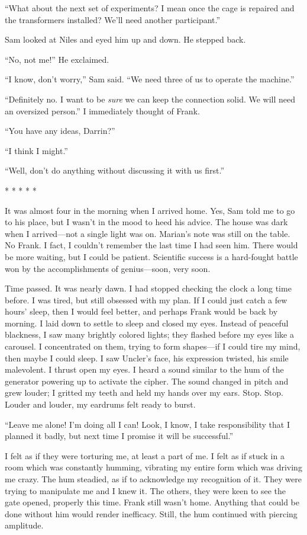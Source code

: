 ``What about the next set of experiments? I mean once the cage is
repaired and the transformers installed? We'll need another
participant.''

Sam looked at Niles and eyed him up and down. He stepped back.

``No, not me!'' He exclaimed.

``I know, don't worry,'' Sam said. ``We need three of us to operate the
machine.''

``Definitely no. I want to be \emph{sure} we can keep the connection
solid. We will need an oversized person.'' I immediately thought of
Frank.

``You have any ideas, Darrin?''

``I think I might.''

``Well, don't do anything without discussing it with us first.''

* * * * *

It was almost four in the morning when I arrived home. Yes, Sam told me
to go to his place, but I wasn't in the mood to heed his advice. The
house was dark when I arrived---not a single light was on. Marian's note
was still on the table. No Frank. I fact, I couldn't remember the last
time I had seen him. There would be more waiting, but I could be
patient. Scientific success is a hard-fought battle won by the
accomplishments of genius---soon, very soon.

Time passed. It was nearly dawn. I had stopped checking the clock a long
time before. I was tired, but still obsessed with my plan. If I could
just catch a few hours' sleep, then I would feel better, and perhaps
Frank would be back by morning. I laid down to settle to sleep and
closed my eyes. Instead of peaceful blackness, I saw many brightly
colored lights; they flashed before my eyes like a carousel. I
concentrated on them, trying to form shapes---if I could tire my mind,
then maybe I could sleep. I saw Uncler's face, his expression twisted,
his smile malevolent. I thrust open my eyes. I heard a sound similar to
the hum of the generator powering up to activate the cipher. The sound
changed in pitch and grew louder; I gritted my teeth and held my hands
over my ears. Stop. Stop. Louder and louder, my eardrums felt ready to
burst.

``Leave me alone! I'm doing all I can! Look, I know, I take
responsibility that I planned it badly, but next time I promise it will
be successful.''

I felt as if they were torturing me, at least a part of me. I felt as if
stuck in a room which was constantly humming, vibrating my entire form
which was driving me crazy. The hum steadied, as if to acknowledge my
recognition of it. They were trying to manipulate me and I knew it. The
others, they were keen to see the gate opened, properly this time. Frank
still wasn't home. Anything that could be done without him would render
inefficacy. Still, the hum continued with piercing amplitude.

